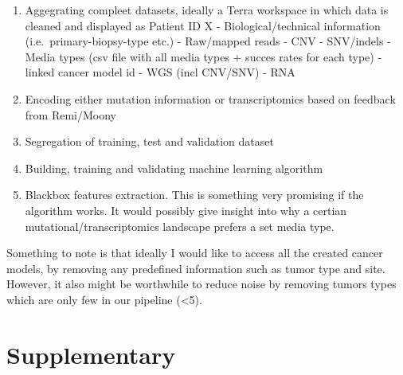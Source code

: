 \documentclass[11pt,]{article}
\providecommand{\tightlist}{%
\setlength{\itemsep}{0pt}\setlength{\parskip}{0pt}}
\begin{document}
\begin{enumerate}
\def\labelenumi{\arabic{enumi}.}
\tightlist
\item
  Aggegrating compleet datasets, ideally a Terra workspace in which data
  is cleaned and displayed as Patient ID X - Biological/technical
  information (i.e.~primary-biopsy-type etc.) - Raw/mapped reads - CNV -
  SNV/indels - Media types (csv file with all media types + succes rates
  for each type) - linked cancer model id - WGS (incl CNV/SNV) - RNA
\item
  Encoding either mutation information or transcriptomics based on
  feedback from Remi/Moony
\item
  Segregation of training, test and validation dataset
\item
  Building, training and validating machine learning algorithm
\item
  Blackbox features extraction. This is something very promising if the
  algorithm works. It would possibly give insight into why a certian
  mutational/transcriptomics landscape prefers a set media type.
\end{enumerate}

Something to note is that ideally I would like to access all the created
cancer models, by removing any predefined information such as tumor type
and site. However, it also might be worthwhile to reduce noise by
removing tumors types which are only few in our pipeline (\textless{}5).

\newpage

\hypertarget{supplementary}{%
\section{Supplementary}\label{supplementary}}
\end{document}
